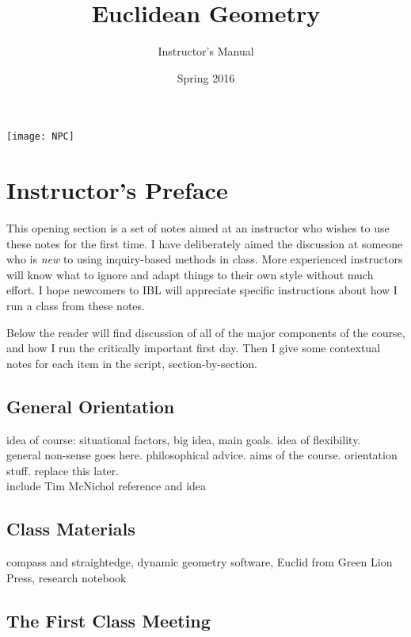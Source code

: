 \documentclass{tufte-handout}
\title{Euclidean Geometry}
\author[Instructor's Manual]{Instructor's Manual}
\date{Spring 2016}
\theoremstyle{definition}
\begin{document}
\maketitle

\begin{marginfigure}
    \texttt{[image: NPC]}
\end{marginfigure}


\setcounter{section}{0}
\setcounter{problem}{0}
\section{Instructor's Preface}

This opening section is a set of notes aimed at an instructor who wishes to use these notes for the first time.
I have deliberately aimed the discussion at someone who is \emph{new} to using inquiry-based methods in class.
More experienced instructors will know what to ignore and adapt things to their own style without much effort.
I hope newcomers to IBL will appreciate specific instructions about how I run a class from these notes.

Below the reader will find discussion of all of the major components of the course, and how I run the critically important first day.
Then I give some contextual notes for each item in the script, section-by-section.

\subsection{General Orientation}

idea of course: situational factors, big idea, main goals. idea of flexibility.\\

general non-sense goes here. philosophical advice. aims of the course. orientation stuff.  replace this later.\\

include Tim McNichol reference and idea

\subsection{Class Materials}

compass and straightedge, dynamic geometry software, Euclid from Green Lion Press, 
research notebook


\subsection{The First Class Meeting}
\end{document}
